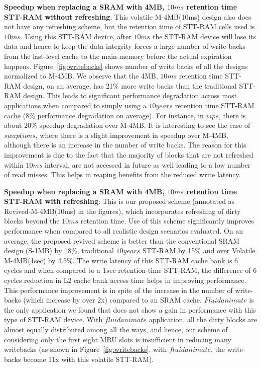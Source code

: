 {\bf Speedup when replacing a SRAM with 4MB, $10ms$ retention time STT-RAM without refreshing}: This volatile M-4MB(10ms) design also does not have any refreshing scheme, but the retention time of STT-RAM cells used is $10ms$. Using this STT-RAM device, after $10ms$ the STT-RAM device will lose its data and hence to keep the data integrity forces a large number of write-backs from the last-level cache to the main-memory before the actual expiration happens. Figure~\ref{fig:writebacks} shows number of write backs of all the designs normalized to M-4MB. We observe that the 4MB, $10ms$ retention time STT-RAM design, on an average, has 21\% more write backs than the traditional STT-RAM design.
This leads to significant performance degradation across most applications when compared to simply using a $10years$ retention time STT-RAM cache (8\% performance degradation on average). For instance, in $vips$, there is about 20\% speedup degradation over M-4MB. It is interesting to see the case of $swaptions$, where there is a slight improvement in speedup over M-4MB, although there is an increase in the number of write backs. The reason for this improvement is due to the fact that the majority of blocks that are not refreshed within $10ms$ interval, are not accessed in future as well leading to a low number of read misses. This helps in reaping benefits from the reduced write latency.

{\bf Speedup when replacing a SRAM with 4MB, $10ms$ retention time STT-RAM with refreshing}: This is our proposed scheme (annotated as Revived-M-4MB(10ms) in the figures), which incorporates refreshing of dirty blocks beyond the $10ms$ retention time.
Use of this scheme significantly improves performance when compared to all realistic design scenarios evaluated. On an average, the proposed revived scheme is better than the conventional SRAM design (S-1MB) by 18\%, traditional $10years$ STT-RAM by 15\% and over Volatile M-4MB(1sec)
by 4.5\%. The write latency of this STT-RAM cache bank is 6 cycles and when compared to a $1sec$ retention time STT-RAM, the difference of 6 cycles reduction in L2 cache bank access time helps in improving performance. This performance improvement is in spite of the increase in the number of write-backs (which increase by over 2x) compared to an SRAM cache. $Fluidanimate$ is the only application we found that does not show a gain in performance with this type of STT-RAM device. With $fluidanimate$ application, all the dirty blocks are almost equally distributed among all the ways, and hence, our scheme of considering only the first eight MRU slots is insufficient in reducing many writebacks (as shown in Figure~\ref{fig:writebacks}, with $fluidanimate$, the write-backs become 11x with this volatile STT-RAM).

